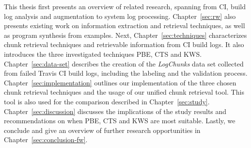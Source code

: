 \documentclass[\myrootdir/main.tex]{subfiles}
\begin{document}
This thesis first presents an overview of related research, spanning from CI, build log analysis and augmentation to system log processing.
Chapter~\ref{sec:rw} also presents existing work on information extraction and retrieval techniques, as well as program synthesis from examples.
Next, Chapter~\ref{sec:techniques} characterizes chunk retrieval techniques and retrievable information from CI build logs.
It also introduces the three investigated techniques PBE, CTS and KWS\@.
Chapter~\ref{sec:data-set} describes the creation of the \emph{LogChunks} data set collected from failed Travis CI build logs, including the labeling and the validation process.
Chapter~\ref{sec:implementation} outlines our implementation of the three chosen chunk retrieval techniques and the usage of our unified chunk retrieval tool.
This tool is also used for the comparison described in Chapter~\ref{sec:study}.
Chapter~\ref{sec:discussion} discusses the implications of the study results and recommendations on when PBE, CTS and KWS are most suitable.
Lastly, we conclude and give an overview of further research opportunities in Chapter~\ref{sec:conclusion-fw}.%




\end{document}
